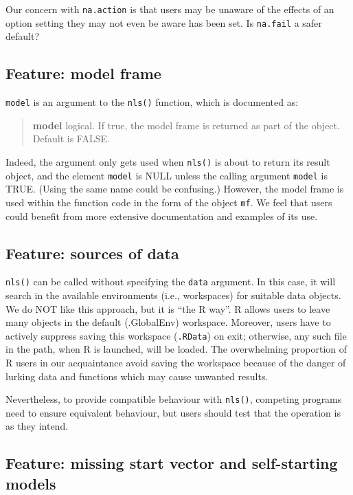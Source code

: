 \documentclass[
]{article}
\begin{document}
Our concern with \texttt{na.action} is that users may be unaware of the
effects of an option setting they may not even be aware has been set. Is
\texttt{na.fail} a safer default?

\hypertarget{feature-model-frame}{%
\subsection{Feature: model frame}\label{feature-model-frame}}

\texttt{model} is an argument to the \texttt{nls()} function, which is
documented as:

\begin{quote}
\textbf{model} logical. If true, the model frame is returned as part of
the object. Default is FALSE.
\end{quote}

Indeed, the argument only gets used when \texttt{nls()} is about to
return its result object, and the element \texttt{model} is NULL unless
the calling argument \texttt{model} is TRUE. (Using the same name could
be confusing.) However, the model frame is used within the function code
in the form of the object \texttt{mf}. We feel that users could benefit
from more extensive documentation and examples of its use.

\hypertarget{feature-sources-of-data}{%
\subsection{Feature: sources of data}\label{feature-sources-of-data}}

\texttt{nls()} can be called without specifying the \texttt{data}
argument. In this case, it will search in the available environments
(i.e., workspaces) for suitable data objects. We do NOT like this
approach, but it is ``the R way''. R allows users to leave many objects
in the default (.GlobalEnv) workspace. Moreover, users have to actively
suppress saving this workspace (\texttt{.RData}) on exit; otherwise, any
such file in the path, when R is launched, will be loaded. The
overwhelming proportion of R users in our acquaintance avoid saving the
workspace because of the danger of lurking data and functions which may
cause unwanted results.

Nevertheless, to provide compatible behaviour with \texttt{nls()},
competing programs need to ensure equivalent behaviour, but users should
test that the operation is as they intend.

\hypertarget{feature-missing-start-vector-and-self-starting-models}{%
\subsection{Feature: missing start vector and self-starting
models}\label{feature-missing-start-vector-and-self-starting-models}}
\end{document}
